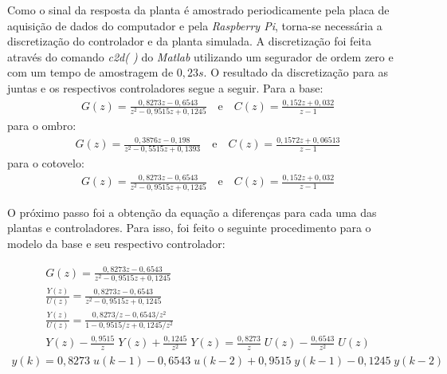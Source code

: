 Como o sinal da resposta da planta é amostrado periodicamente pela placa de aquisição de dados do
computador e pela \textit{Raspberry Pi}, torna-se necessária a discretização do controlador e da planta simulada. A 
discretização foi feita através do comando \textit{c2d( )} do \textit{Matlab} utilizando um segurador de 
ordem zero e com um tempo de amostragem de $0,23s$. O resultado da discretização para as juntas e os respectivos
controladores segue a seguir.
Para a base:
\begin{equation}
  \begin{gathered}
    G(z) = \frac{0,8273z - 0,6543}{z^2 - 0,9515z + 0,1245} \quad \text{e} \quad C(z) = \frac{0,152z + 0,032}{z - 1}
  \end{gathered}
  \label{eq:base_discrete}
\end{equation}
para o ombro:
\begin{equation}
  \begin{gathered}
    G(z) = \frac{0,3876z - 0,198}{z^2 - 0,5515z + 0,1393} \quad \text{e} \quad C(z) = \frac{0,1572z + 0,06513}{z - 1}
  \end{gathered}
  \label{eq:shoulder_discrete}
\end{equation}
para o cotovelo:
\begin{equation}
  \begin{gathered}
   G(z) = \frac{0,8273z - 0,6543}{z^2 - 0,9515z + 0,1245} \quad \text{e} \quad C(z) = \frac{0,152z + 0,032}{z - 1}
  \end{gathered}
  \label{eq:forearm_discrete}
\end{equation}

O próximo passo foi a obtenção da equação a diferenças para cada uma das plantas e
controladores. Para isso, foi feito o seguinte procedimento para o modelo da base e seu respectivo controlador:

\begin{equation*}
  \begin{gathered}
    G(z) = \frac{0,8273z - 0,6543}{z^2 - 0,9515z + 0,1245} \\[0.5cm]
    \frac{Y(z)}{U(z)} = \frac{0,8273z - 0,6543}{z^2 - 0,9515z + 0,1245}\\[0.5cm]
    \frac{Y(z)}{U(z)} = \frac{0,8273/z - 0,6543/z^2}{1 - 0,9515/z + 0,1245/z^2}\\[0.5cm]
    Y(z) - \frac{0,9515}{z} \;Y(z) + \frac{0,1245}{z^2} \;Y(z) = \frac{0,8273}{z} \;U(z) - \frac{0,6543}{z^2} \;U(z)
  \end{gathered}
  \label{eq:base_plant_diffEqIntro}
\end{equation*}
\begin{equation}
  \begin{gathered}
    y(k) = 0,8273 \;u(k-1) - 0,6543 \;u(k-2) + 0,9515 \;y(k-1) - 0,1245 \;y(k-2)
  \end{gathered}
  \label{eq:base_plant_diffEq}
\end{equation}

